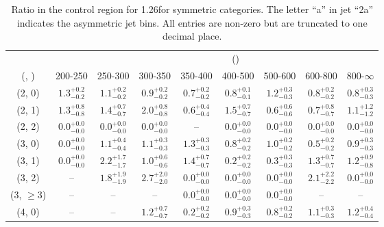 \begin{table}[h!]
\tiny
\centering
\caption{Ratio in the \mmj control region for 1.26\ifb for symmetric categories. The letter ``a'' in jet \eg ``2a''  indicates the asymmetric jet bins. All entries are non-zero but are truncated to one decimal place.\label{tab:ratiosep_ewk_mumu_sym}}
\begin{tabular}
{ccccccccc}
	\hline\hline
&	& \multicolumn{8}{c}{\scalht (\gev)} \\ 
	 (\njet,  \nb) & 200-250 & 250-300 & 300-350 & 350-400 & 400-500 & 500-600 & 600-800 & 800-$\infty$ \\ [0.8ex] 
\hline
	(2, 0) & $1.3^{+ 0.2 }_{- 0.2 }$ & $1.1^{+ 0.2 }_{- 0.2 }$ & $0.9^{+ 0.2 }_{- 0.2 }$ & $0.7^{+ 0.2 }_{- 0.2 }$ & $0.8^{+ 0.1 }_{- 0.1 }$ & $1.2^{+ 0.3 }_{- 0.3 }$ & $0.8^{+ 0.2 }_{- 0.2 }$ & $0.8^{+ 0.3 }_{- 0.3 }$ \\[0.5ex] 
	(2, 1) & $1.3^{+ 0.8 }_{- 0.8 }$ & $1.4^{+ 0.7 }_{- 0.7 }$ & $2.0^{+ 0.8 }_{- 0.8 }$ & $0.6^{+ 0.4 }_{- 0.4 }$ & $1.5^{+ 0.7 }_{- 0.7 }$ & $0.6^{+ 0.6 }_{- 0.6 }$ & $0.7^{+ 0.8 }_{- 0.7 }$ & $1.1^{+ 1.2 }_{- 1.2 }$ \\[0.5ex] 
	(2, 2) & $0.0^{+ 0.0 }_{- 0.0 }$ & $0.0^{+ 0.0 }_{- 0.0 }$ & $0.0^{+ 0.0 }_{- 0.0 }$ & -- & $0.0^{+ 0.0 }_{- 0.0 }$ & $0.0^{+ 0.0 }_{- 0.0 }$ & $0.0^{+ 0.0 }_{- 0.0 }$ & $0.0^{+ 0.0 }_{- 0.0 }$ \\[0.5ex] 
	(3, 0) & $0.0^{+ 0.0 }_{- 0.0 }$ & $1.1^{+ 0.4 }_{- 0.4 }$ & $1.1^{+ 0.3 }_{- 0.3 }$ & $1.3^{+ 0.3 }_{- 0.3 }$ & $0.8^{+ 0.2 }_{- 0.2 }$ & $1.0^{+ 0.2 }_{- 0.2 }$ & $0.5^{+ 0.2 }_{- 0.2 }$ & $0.9^{+ 0.3 }_{- 0.3 }$ \\[0.5ex] 
	(3, 1) & $0.0^{+ 0.0 }_{- 0.0 }$ & $2.2^{+ 1.7 }_{- 1.7 }$ & $1.0^{+ 0.6 }_{- 0.6 }$ & $1.4^{+ 0.7 }_{- 0.7 }$ & $0.2^{+ 0.2 }_{- 0.2 }$ & $0.3^{+ 0.3 }_{- 0.3 }$ & $1.3^{+ 0.7 }_{- 0.7 }$ & $1.2^{+ 0.9 }_{- 0.8 }$ \\[0.5ex] 
	(3, 2) & -- & $1.8^{+ 1.9 }_{- 1.9 }$ & $2.7^{+ 2.0 }_{- 2.0 }$ & $0.0^{+ 0.0 }_{- 0.0 }$ & $0.0^{+ 0.0 }_{- 0.0 }$ & $0.0^{+ 0.0 }_{- 0.0 }$ & $2.1^{+ 2.2 }_{- 2.2 }$ & $0.0^{+ 0.0 }_{- 0.0 }$ \\[0.5ex] 
	(3, $\ge3$) & -- & -- & -- & $0.0^{+ 0.0 }_{- 0.0 }$ & $0.0^{+ 0.0 }_{- 0.0 }$ & $0.0^{+ 0.0 }_{- 0.0 }$ & -- & -- \\[0.5ex] 
	(4, 0) & -- & -- & $1.2^{+ 0.7 }_{- 0.7 }$ & $0.2^{+ 0.2 }_{- 0.2 }$ & $0.9^{+ 0.3 }_{- 0.3 }$ & $0.8^{+ 0.2 }_{- 0.2 }$ & $1.1^{+ 0.3 }_{- 0.3 }$ & $1.2^{+ 0.4 }_{- 0.4 }$ \\[0.5ex] 

\end{tabular}
\end{table}
